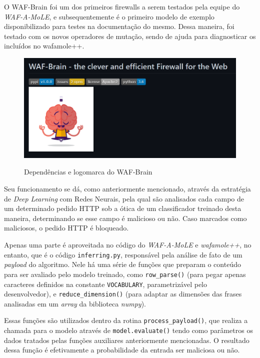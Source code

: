 O WAF-Brain \cite{waf_brain} foi um dos primeiros firewalls a serem testados pela equipe do \textit{WAF-A-MoLE}, e subsequentemente é o primeiro modelo de exemplo disponibilizado para testes na documentação do mesmo. Dessa maneira, foi testado com os novos operadores de mutação, sendo de ajuda para diagnosticar os incluídos no wafamole++.

\begin{figure}[ht]
    \centering
    \caption{Dependências e logomarca do WAF-Brain}
    \includegraphics[width=12.5cm]{figuras/WAFBrain.png} 
    \label{fig:internet} 
\end{figure}

Seu funcionamento se dá, como anteriormente mencionado, através da estratégia de \textit{Deep Learning} com Redes Neurais, pela qual são analisados cada campo de um determinado pedido HTTP sob a ótica de um classificador treinado desta maneira, determinando se esse campo é malicioso ou não. Caso marcados como maliciosos, o pedido HTTP é bloqueado.

Apenas uma parte é aproveitada no código do \textit{WAF-A-MoLE} e \textit{wafamole++}, no entanto, que é o código \verb+inferring.py+, responsável pela análise de fato de um \textit{payload} do algoritmo. Nele há uma série de funções que preparam o conteúdo para ser avaliado pelo modelo treinado, como \verb+row_parse()+ (para pegar apenas caracteres definidos na constante \verb+VOCABULARY+, parametrizável pelo desenvolvedor), e \verb+reduce_dimension()+ (para adaptar as dimensões das frases analisadas em um \textit{array} da biblioteca \textit{numpy}).

Essas funções são utilizados dentro da rotina \verb+process_payload()+, que realiza a chamada para o modelo através de \verb+model.evaluate()+ tendo como parâmetros os dados tratados pelas funções auxiliares anteriormente mencionadas. O resultado dessa função é efetivamente a probabilidade da entrada ser maliciosa ou não.

